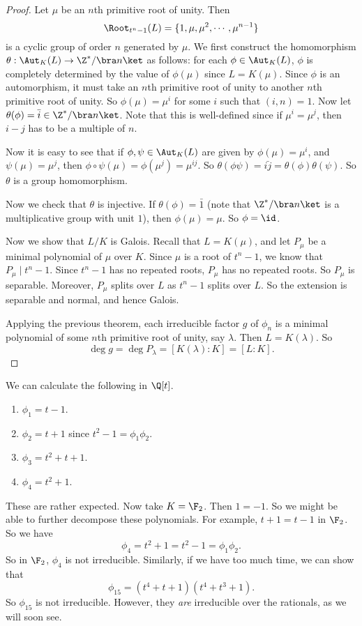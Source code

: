 \documentclass[a4paper]{article}
\begin{document}
\begin{proof}
  Let $\mu$ be an $n$th primitive root of unity. Then
  \[
    \Root_{t^n - 1}(L) = \{1, \mu, \mu^2, \cdots, \mu^{n - 1}\}
  \]
  is a cyclic group of order $n$ generated by $\mu$. We first construct the homomorphism $\theta: \Aut_K(L) \to \Z^*/\bra n\ket$ as follows: for each $\phi \in \Aut_K(L)$, $\phi$ is completely determined by the value of $\phi(\mu)$ since $L = K(\mu)$. Since $\phi$ is an automorphism, it must take an $n$th primitive root of unity to another $n$th primitive root of unity. So $\phi(\mu) = \mu^i$ for some $i$ such that $(i, n) = 1$. Now let $\theta(\phi) = \bar{i} \in \Z^*/\bra n\ket$. Note that this is well-defined since if $\mu^i = \mu^j$, then $i - j$ has to be a multiple of $n$.

  Now it is easy to see that if $\phi, \psi \in \Aut_K(L)$ are given by $\phi(\mu) = \mu^i$, and $\psi(\mu) = \mu^j$, then $\phi\circ \psi(\mu) = \phi(\mu^j) = \mu^{ij}$. So $\theta(\phi \psi) = \bar{ij} = \theta(\phi)\theta(\psi)$. So $\theta$ is a group homomorphism.

  Now we check that $\theta$ is injective. If $\theta(\phi) = \bar{1}$ (note that $\Z^*/\bra n\ket$ is a multiplicative group with unit $1$), then $\phi(\mu) = \mu$. So $\phi = \id$.

  Now we show that $L/K$ is Galois. Recall that $L = K(\mu)$, and let $P_\mu$ be a minimal polynomial of $\mu$ over $K$. Since $\mu$ is a root of $t^n - 1$, we know that $P_\mu \mid t^n - 1$. Since $t^n - 1$ has no repeated roots, $P_\mu$ has no repeated roots. So $P_\mu$ is separable. Moreover, $P_\mu$ splits over $L$ as $t^n - 1$ splits over $L$. So the extension is separable and normal, and hence Galois.

  Applying the previous theorem, each irreducible factor $g$ of $\phi_n$ is a minimal polynomial of some $n$th primitive root of unity, say $\lambda$. Then $L = K(\lambda)$. So
  \[
    \deg g = \deg P_\lambda = [K(\lambda): K] = [L:K].
  \]
\end{proof}

\begin{eg}
  We can calculate the following in $\Q[t]$.
  \begin{enumerate}
    \item $\phi_1 = t - 1$.
    \item $\phi_2 = t + 1$ since $t^2 - 1 = \phi_1 \phi_2$.
    \item $\phi_3 = t^2 + t + 1$.
    \item $\phi_4 = t^2 + 1$.
  \end{enumerate}
  These are rather expected. Now take $K = \F_2$. Then $1 = -1$. So we might be able to further decompose these polynomials. For example, $t + 1 = t - 1$ in $\F_2$. So we have
  \[
    \phi_4 = t^2 + 1 = t^2 - 1 = \phi_1 \phi_2.
  \]
  So in $\F_2$, $\phi_4$ is not irreducible. Similarly, if we have too much time, we can show that
  \[
    \phi_{15} = (t^4 + t + 1)(t^4 + t^3 + 1).
  \]
  So $\phi_{15}$ is not irreducible. However, they \emph{are} irreducible over the rationals, as we will soon see.
\end{eg}
\end{document}
